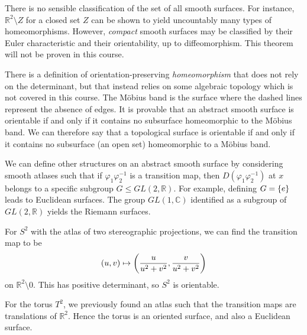 \begin{remark}
	There is no sensible classification of the set of all smooth surfaces.
	For instance, \( \mathbb R^2 \setminus Z \) for a closed set \( Z \) can be shown to yield uncountably many types of homeomorphisms.
	However, \textit{compact} smooth surfaces may be classified by their Euler characteristic and their orientability, up to diffeomorphism.
	This theorem will not be proven in this course.

	There is a definition of orientation-preserving \textit{homeomorphism} that does not rely on the determinant, but that instead relies on some algebraic topology which is not covered in this course.
	The M\"obius band is the surface
	where the dashed lines represent the absence of edges.
	It is provable that an abstract smooth surface is orientable if and only if it contains no subsurface homeomorphic to the M\"obius band.
	We can therefore say that a topological surface is orientable if and only if it contains no subsurface (an open set) homeomorphic to a M\"obius band.

	We can define other structures on an abstract smooth surface by considering smooth atlases such that if \( \varphi_1 \varphi_2^{-1} \) is a transition map, then \( D (\varphi_1 \varphi_2^{-1}) \) at \( x \) belongs to a specific subgroup \( G \leq GL(2, \mathbb R) \).
	For example, defining \( G = \qty{e} \) leads to Euclidean surfaces.
	The group \( GL(1, \mathbb C) \) identified as a subgroup of \( GL(2, \mathbb R) \) yields the Riemann surfaces.
\end{remark}
\begin{example}
	For \( S^2 \) with the atlas of two stereographic projections, we can find the transition map to be
	\[
		(u,v) \mapsto \qty(\frac{u}{u^2 + v^2}, \frac{v}{u^2 + v^2})
	\]
	on \( \mathbb R^2 \setminus \qty{0} \).
	This has positive determinant, so \( S^2 \) is orientable.

	For the torus \( T^2 \), we previously found an atlas such that the transition maps are translations of \( \mathbb R^2 \).
	Hence the torus is an oriented surface, and also a Euclidean surface.
\end{example}

